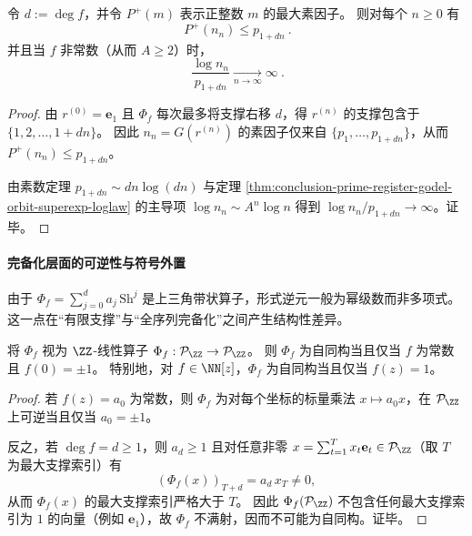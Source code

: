 \begin{proposition}[轨道整数的极端光滑性]\label{prop:conclusion-godel-orbit-extreme-smoothness}
令 \(d:=\deg f\)，并令 \(P^{+}(m)\) 表示正整数 \(m\) 的最大素因子。
则对每个 \(n\ge 0\) 有
\[
\boxed{\ P^{+}(n_n)\le p_{1+dn}\ }.
\]
并且当 \(f\) 非常数（从而 \(A\ge 2\)）时，
\[
\boxed{\ \frac{\log n_n}{p_{1+dn}}\xrightarrow[n\to\infty]{}\infty\ }.
\]
\end{proposition}
\begin{proof}
由 \(r^{(0)}=\mathbf e_1\) 且 \(\Phi_f\) 每次最多将支撑右移 \(d\)，得 \(r^{(n)}\) 的支撑包含于 \(\{1,2,\dots,1+dn\}\)。
因此 \(n_n=G(r^{(n)})\) 的素因子仅来自 \(\{p_1,\dots,p_{1+dn}\}\)，从而 \(P^{+}(n_n)\le p_{1+dn}\)。

由素数定理 \(p_{1+dn}\sim dn\log(dn)\) 与定理 \ref{thm:conclusion-prime-register-godel-orbit-superexp-loglaw} 的主导项
\(
\log n_n\sim A^n\log n
\)
得到 \(\log n_n/p_{1+dn}\to\infty\)。证毕。
\end{proof}

\paragraph{完备化层面的可逆性与符号外置}
由于 \(\Phi_f=\sum_{j=0}^{d}a_j\,\mathrm{Sh}^{j}\) 是上三角带状算子，形式逆元一般为幂级数而非多项式。
这一点在“有限支撑”与“全序列完备化”之间产生结构性差异。

\begin{proposition}[有限支撑群上的自同构判据]\label{prop:conclusion-prime-register-finite-support-invertibility}
将 \(\Phi_f\) 视为 \(\ZZ\)-线性算子 \(\Phi_f:\mathcal P_{\ZZ}\to\mathcal P_{\ZZ}\)。
则 \(\Phi_f\) 为自同构当且仅当 \(f\) 为常数且 \(f(0)=\pm 1\)。
特别地，对 \(f\in\NN[z]\)，\(\Phi_f\) 为自同构当且仅当 \(f(z)=1\)。
\end{proposition}
\begin{proof}
若 \(f(z)=a_0\) 为常数，则 \(\Phi_f\) 为对每个坐标的标量乘法 \(x\mapsto a_0 x\)，在 \(\mathcal P_{\ZZ}\) 上可逆当且仅当 \(a_0=\pm 1\)。

反之，若 \(\deg f=d\ge 1\)，则 \(a_d\ge 1\) 且对任意非零 \(x=\sum_{t=1}^{T}x_t\mathbf e_t\in\mathcal P_{\ZZ}\)（取 \(T\) 为最大支撑索引）有
\[
(\Phi_f(x))_{T+d}=a_d\,x_T\neq 0,
\]
从而 \(\Phi_f(x)\) 的最大支撑索引严格大于 \(T\)。
因此 \(\Phi_f(\mathcal P_{\ZZ})\) 不包含任何最大支撑索引为 \(1\) 的向量（例如 \(\mathbf e_1\)），故 \(\Phi_f\) 不满射，因而不可能为自同构。证毕。
\end{proof}


